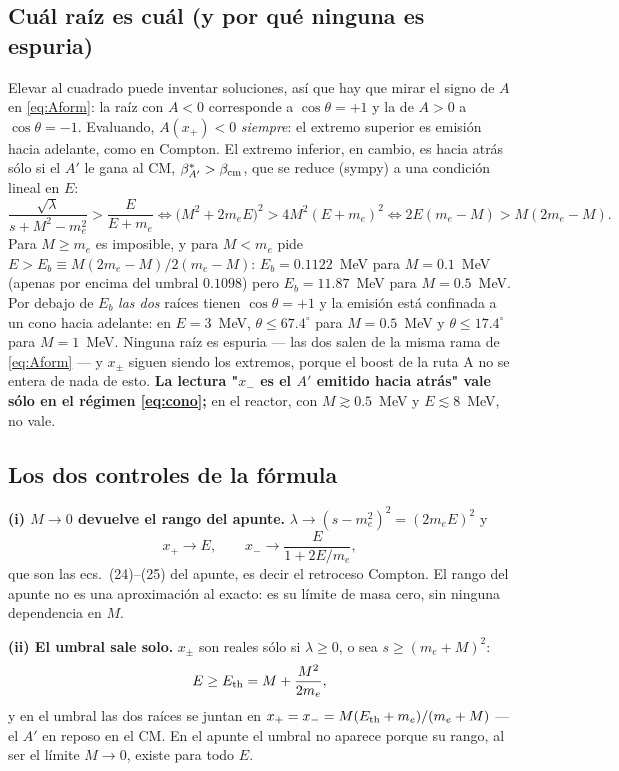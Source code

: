 \documentclass[11pt,a4paper]{article}
\newcommand{\Ap}{A'}
\begin{document}
\subsection{Cuál raíz es cuál (y por qué ninguna es espuria)}
Elevar al cuadrado puede inventar soluciones, así que hay que mirar el signo de $A$ en \eqref{eq:Aform}: la raíz con
$A<0$ corresponde a $\cos\theta=+1$ y la de $A>0$ a $\cos\theta=-1$. Evaluando, $A(x_+)<0$ \emph{siempre}: el
extremo superior es emisión hacia adelante, como en Compton. El extremo inferior, en cambio, es hacia atrás sólo si
el $\Ap$ le gana al CM, $\beta^*_{\Ap}>\beta_{\rm cm}$, que se reduce (sympy) a una condición lineal en $E$:
\begin{equation}
\frac{\sqrt\lambda}{s+M^2-m_e^2}>\frac{E}{E+m_e}
\iff \big(M^2+2m_eE\big)^2>4M^2(E+m_e)^2
\iff 2E(m_e-M)>M(2m_e-M).
\label{eq:cono}
\end{equation}
Para $M\ge m_e$ es imposible, y para $M<m_e$ pide $E>E_b\equiv M(2m_e-M)/2(m_e-M)$: $E_b=0.1122$~MeV para
$M=0.1$~MeV (apenas por encima del umbral $0.1098$) pero $E_b=11.87$~MeV para $M=0.5$~MeV. Por debajo de $E_b$
\emph{las dos} raíces tienen $\cos\theta=+1$ y la emisión está confinada a un cono hacia adelante: en $E=3$~MeV,
$\theta\le67.4^\circ$ para $M=0.5$~MeV y $\theta\le17.4^\circ$ para $M=1$~MeV. Ninguna raíz es espuria --- las dos
salen de la misma rama de \eqref{eq:Aform} --- y $x_\pm$ siguen siendo los extremos, porque el boost de la ruta A no
se entera de nada de esto. \textbf{La lectura "$x_-$ es el $\Ap$ emitido hacia atrás" vale sólo en el régimen
\eqref{eq:cono};} en el reactor, con $M\gtrsim0.5$~MeV y $E\lesssim8$~MeV, no vale.

\subsection{Los dos controles de la fórmula}
\textbf{(i) $M\to0$ devuelve el rango del apunte.} $\lambda\to(s-m_e^2)^2=(2m_eE)^2$ y
\begin{equation}
x_+\to E,\qquad x_-\to\frac{E}{1+2E/m_e},
\end{equation}
que son las ecs.~(24)--(25) del apunte, es decir el retroceso Compton. El rango del apunte no es una aproximación al
exacto: es su límite de masa cero, sin ninguna dependencia en $M$.

\smallskip
\noindent\textbf{(ii) El umbral sale solo.} $x_\pm$ son reales sólo si $\lambda\ge0$, o sea $s\ge(m_e+M)^2$:
\begin{equation}
E\ge E_{\rm th}=M+\frac{M^2}{2m_e},
\end{equation}
y en el umbral las dos raíces se juntan en $x_+=x_-=M(E_{\rm th}+m_e)/(m_e+M)$ --- el $\Ap$ en reposo en el CM. En el
apunte el umbral no aparece porque su rango, al ser el límite $M\to0$, existe para todo $E$.
\end{document}
